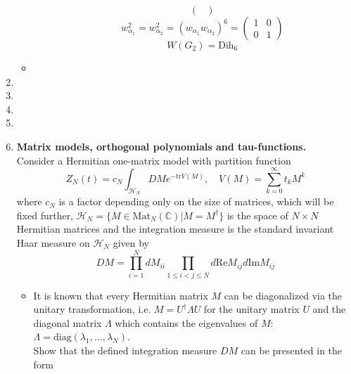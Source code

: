 \documentclass[12pt]{article}
\theoremstyle{definition}
\begin{document}
\begin{enumerate}
\begin{itemize}
\begin{itemize}
\begin{equation}
\begin{pmatrix}
                \end{pmatrix}
            \end{equation}
            \begin{equation}
                w^2_{\alpha_1}=w^2_{\alpha_2}=(w_{\alpha_1}w_{\alpha_2})^6=\begin{pmatrix}
                    1 & 0\\
                    0 & 1
                \end{pmatrix}
            \end{equation}
            \begin{equation}
                \boxed{W(G_2)=\text{Dih}_6}
            \end{equation}
        \end{itemize}
        \item
    \end{itemize}
    \item
    \item
    \item
    \item
    \item \textbf{Matrix models, orthogonal polynomials and tau-functions.}\\
    Consider a Hermitian one-matrix model with partition function
    \begin{equation}
        Z_N(t)=c_N\int_{\mathcal{H}_N}DMe^{-\text{tr}V(M)},\quad V(M)=\sum\limits_{k=0}^\infty t_kM^k
    \end{equation}
    where $c_N$ is a factor depending only on the size of matrices, which will be fixed further, $\mathcal{H}_N =\{M\in\text{Mat}_N(\mathbb{C})|M = M^\dagger\}$ is the space of $N \times N$ Hermitian matrices and the integration measure is the standard invariant Haar measure on $\mathcal{H}_N$ given by
    \begin{equation}
        DM=\prod\limits_{i=1}^NdM_{ii}\prod\limits_{1\leq i<j\leq N}d\text{Re}M_{ij}d\text{Im}M_{ij}
    \end{equation}
    \begin{itemize}
        \item It is known that every Hermitian matrix $M$ can be diagonalized via the unitary transformation, i.e. $M = U^\dagger\Lambda U$ for the unitary matrix $U$ and the diagonal matrix $\Lambda$ which contains the eigenvalues of $M$: $\Lambda = \text{diag}(\lambda_1,...,\lambda_N)$.\\
        Show that the defined integration measure $DM$ can be presented in the form

\end{itemize}
\end{enumerate}
\end{document}
